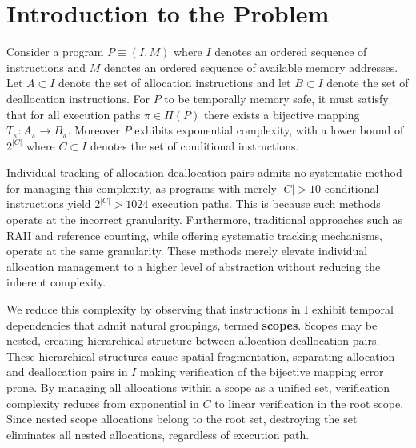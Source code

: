 \section{Introduction to the Problem}
\label{sec:Introduction-to-the-Problem}

Consider a program $P \equiv (I, M)$ where $I$ denotes an ordered sequence of instructions and $M$ denotes an ordered sequence of available memory addresses.
Let $A \subset I$ denote the set of allocation instructions and let $B \subset I$ denote
the set of deallocation instructions. For $P$ to be temporally memory safe, it must satisfy
that for all execution paths $\pi \in \Pi(P)$ there exists a bijective mapping $T_{\pi}: A_{\pi} \rightarrow B_{\pi}$. Moreover $P$ exhibits exponential complexity, with a lower bound of $2^{|C|}$ where $C \subset I$ denotes the set of conditional instructions.

\vspace{1em}

Individual tracking of allocation-deallocation pairs admits no systematic method for managing this complexity, as programs with merely $|C| > 10$ conditional instructions yield $2^{|C|} > 1024$ execution paths. This is because such methods operate at the incorrect granularity. Furthermore, traditional approaches such as RAII and reference counting, while offering systematic tracking mechanisms, operate at the same granularity. These methods merely elevate individual allocation management to a higher level of abstraction without reducing the inherent complexity. 

\vspace{1em}

We reduce this complexity by observing that instructions in I exhibit temporal dependencies that admit natural groupings, termed \textbf{scopes}. Scopes may be nested, creating hierarchical structure between allocation-deallocation pairs. These hierarchical structures cause spatial fragmentation, separating allocation and deallocation pairs in $I$ making verification of the bijective mapping error prone. By managing all allocations within a scope as a unified set, verification complexity reduces from exponential in $C$ to linear verification in the root scope. Since nested scope allocations belong to the root set, destroying the set eliminates all nested allocations, regardless of execution path.

\newpage